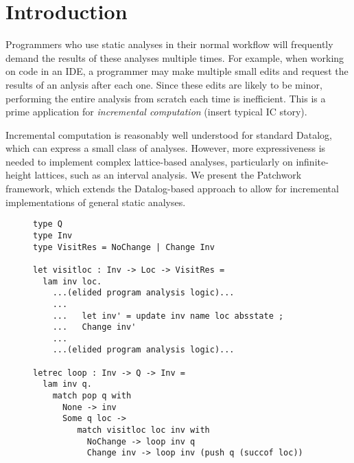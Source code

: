 \documentclass[acmlarge,anonymous]{acmart}\settopmatter{printfolios=true}
\begin{document}
\section{Introduction}

Programmers who use static analyses in their normal workflow will frequently demand the results of these analyses multiple times. For example, when working on code in an IDE, a programmer may make multiple small edits and request the results of an anlysis after each one. Since these edits are likely to be minor, performing the entire analysis from scratch each time is inefficient. This is a prime application for \textit{incremental computation} (insert typical IC story). 

Incremental computation is reasonably well understood for standard Datalog, which can express a small class of analyses. However, more expressiveness is needed to implement complex lattice-based analyses, particularly on infinite-height lattices, such as an interval analysis. We present the Patchwork framework, which extends the Datalog-based approach to allow for incremental implementations of general static analyses.

\begin{figure}
\begin{lstlisting}
type Q
type Inv
type VisitRes = NoChange | Change Inv

let visitloc : Inv -> Loc -> VisitRes =
  lam inv loc. 
    ...(elided program analysis logic)...
    ...
    ...   let inv' = update inv name loc absstate ;
    ...   Change inv'
    ...
    ...(elided program analysis logic)...

letrec loop : Inv -> Q -> Inv =
  lam inv q.
    match pop q with
      None -> inv
      Some q loc ->
         match visitloc loc inv with
           NoChange -> loop inv q
           Change inv -> loop inv (push q (succof loc))    
\end{lstlisting}
\end{figure}

\newcommand{\TabYes}{\ensuremath{\blacksquare}}
\newcommand{\TabNo}{\ensuremath{\square}}
\end{document}
